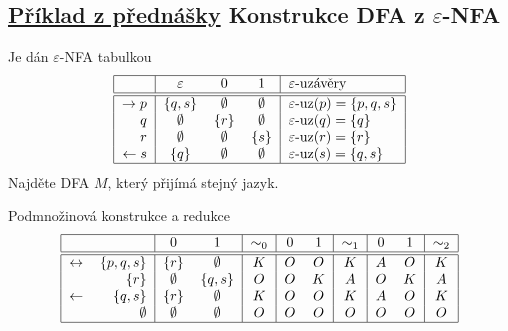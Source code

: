 \subsection{\href{https://youtu.be/Hbi2ao1mFBc?list=PLQL6z4JeTTQkLuzI78OTnfYBclE1g0UjS&t=1823}{Příklad z přednášky} Konstrukce DFA z \texorpdfstring{$\varepsilon$}{e}-NFA}
Je dán $\varepsilon$-NFA tabulkou
\[
    \begin{tabular}{|r|c c c|l|}
        \hline
        & $\varepsilon$ & $0$ & $1$ & $\varepsilon$-uzávěry \\ \hline \hline
        $\rightarrow p$& $\bc{q,s}$  & $\emptyset$ & $\emptyset$ & $\varepsilon\text{-uz}(p) = \bc{p,q,s}$ \\
        $q$            & $\emptyset$ & $\bc{r}$    & $\emptyset$ & $\varepsilon\text{-uz}(q) = \bc{q}$ \\
        $r$            & $\emptyset$ & $\emptyset$ & $\bc{s}$    & $\varepsilon\text{-uz}(r) = \bc{r}$ \\
        $\leftarrow s$ & $\bc{q}$    & $\emptyset$ & $\emptyset$ & $\varepsilon\text{-uz}(s) = \bc{q,s}$\\
        \hline
    \end{tabular}
\]
Najděte DFA $M$, který přijímá stejný jazyk.

\begin{multicols}{2}
    Podmnožinová konstrukce a redukce
    \[
        \begin{tabular}{|r r|c c|c|c c|c|c c|c|c c|c|}
            \hline
            & $ $ & $0$ & $1$ & $\sim_0$ & $0$ & $1$ & $\sim_1$ & $0$ & $1$ & $\sim_2$ \\ \hline \hline
            $\leftrightarrow$ &$\bc{p,q,s}$ & $\bc{r}$& $\emptyset$ & $K$ & $O$ & $O$ & $K$ & $A$ & $O$ & $K$ \\
                          &$\bc{r}$     & $\emptyset$ & $\bc{q,s}$  & $O$ & $O$ & $K$ & $A$ & $O$ & $K$ & $A$ \\
            $\leftarrow$  &$\bc{q,s}$   & $\bc{r}$    & $\emptyset$ & $K$ & $O$ & $O$ & $K$ & $A$ & $O$ & $K$ \\
                          &$\emptyset$  & $\emptyset$ & $\emptyset$ & $O$ & $O$ & $O$ & $O$ & $O$ & $O$ & $O$ \\
            \hline
        \end{tabular}
    \]

\columnbreak

    \hspace*{2cm}
\end{multicols}

